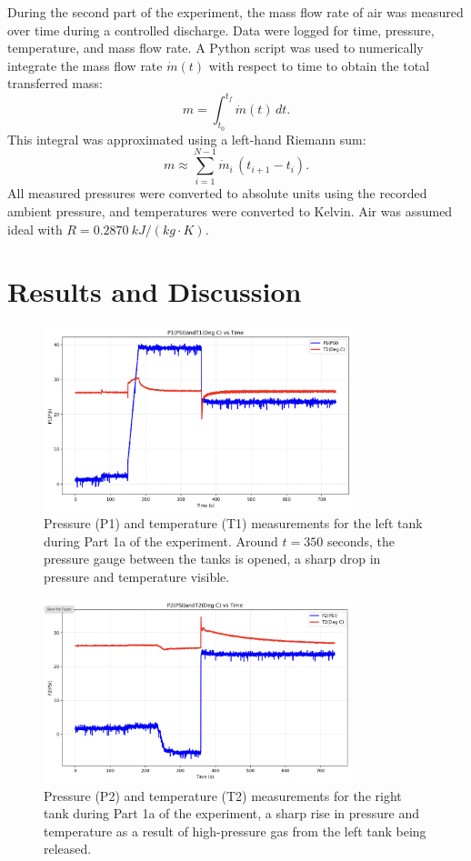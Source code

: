 \documentclass[12pt]{article}
\begin{document}
During the second part of the experiment, the mass flow rate of air was measured over time during a controlled discharge. Data were logged for time, pressure, temperature, and mass flow rate.  
A Python script was used to numerically integrate the mass flow rate \(\dot m(t)\) with respect to time to obtain the total transferred mass:
\[
m = \int_{t_0}^{t_f} \dot m(t)\,dt.
\]
This integral was approximated using a left-hand Riemann sum:
\[
m \approx \sum_{i=1}^{N-1} \dot m_i \,(t_{i+1}-t_i).
\]
All measured pressures were converted to absolute units using the recorded ambient pressure, and temperatures were converted to Kelvin. Air was assumed ideal with \(R = 0.2870~\si{kJ/(kg\cdot K)}\).

\section*{Results and Discussion}

\begin{figure}[h!]
\centering
\includegraphics[width=0.8\textwidth]{1a-left_tank.png}
\caption{Pressure (P1) and temperature (T1) measurements for the left tank during Part 1a of the experiment. Around $t = 350$ seconds, the pressure gauge between the tanks is opened, a sharp drop in pressure and temperature visible.}
\label{fig:tank1_data_a}
\end{figure}

\begin{figure}[h!]
\centering
\includegraphics[width=0.8\textwidth]{1a-right_tank.png}
\caption{Pressure (P2) and temperature (T2) measurements for the right tank during Part 1a of the experiment, a sharp rise in pressure and temperature as a result of high-pressure gas from the left tank being released.}
\label{fig:tank2_data_a}
\end{figure}
\end{document}

